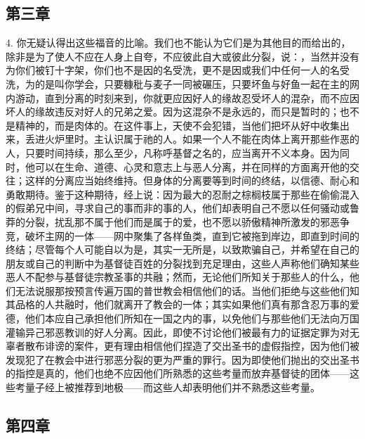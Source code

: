 \subsection{第三章}

4. 你无疑认得出这些福音的比喻。我们也不能认为它们是为其他目的而给出的，除非是为了使人不应在人身上自夸，不应彼此自大或彼此分裂，说：，当然并没有为你们被钉十字架，你们也不是因的名受洗，更不是因或我们中任何一人的名受洗，为的是叫你学会，只要糠秕与麦子一同被碾压，只要坏鱼与好鱼一起在主的网内游动，直到分离的时刻来到，你就更应因好人的缘故忍受坏人的混杂，而不应因坏人的缘故违反对好人的兄弟之爱。因为这混杂不是永远的，而只是暂时的；也不是精神的，而是肉体的。在这件事上，天使不会犯错，当他们把坏从好中收集出来，丢进火炉里时。主认识属于祂的人。如果一个人不能在肉体上离开那些作恶的人，只要时间持续，那么至少，凡称呼基督之名的，应当离开不义本身。因为同时，他可以在生命、道德、心灵和意志上与恶人分离，并在同样的方面离开他的交往；这样的分离应当始终维持。但身体的分离要等到时间的终结，以信德、耐心和勇敢期待。鉴于这种期待，经上说：因为最大的忍耐之棕榈枝属于那些在偷偷混入的假弟兄中间，寻求自己的事而非的事的人，他们却表明自己不愿以任何骚动或鲁莽的分裂，扰乱那不属于他们而是属于的爱，也不愿以骄傲精神所激发的邪恶争竞，破坏主网的一体——网中聚集了各样鱼类，直到它被拖到岸边，即直到时间的终结；尽管每个人可能自以为是，其实一无所是，以致欺骗自己，并希望在自己的朋友或自己的判断中为基督徒百姓的分裂找到充足理由，这些人声称他们确知某些恶人不配参与基督徒宗教圣事的共融；然而，无论他们所知关于那些人的什么，他们无法说服那按预言传遍万国的普世教会相信他们的话。当他们拒绝与这些他们知其品格的人共融时，他们就离开了教会的一体；其实如果他们真有那含忍万事的爱德，他们本应自己承担他们所知在一国之内的事，以免他们与那些他们无法向万国灌输异己邪恶教训的好人分离。因此，即使不讨论他们被最有力的证据定罪为对无辜者散布诽谤的案件，更有理由相信他们捏造了交出圣书的虚假指控，因为他们被发现犯了在教会中进行邪恶分裂的更为严重的罪行。因为即使他们抛出的交出圣书的指控是真的，他们也绝不应因他们所熟悉的这些考量而放弃基督徒的团体——这些考量子经上被推荐到地极——而这些人却表明他们并不熟悉这些考量。\par


\subsection{第四章}

